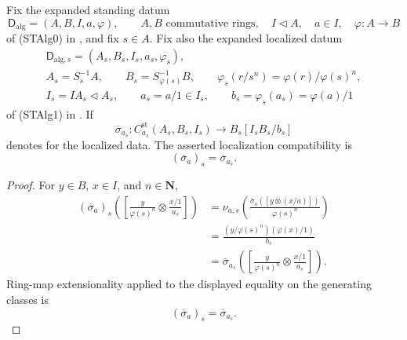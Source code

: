 \begin{lemma}
  \label{lemma:nagata-strict-transform-chart-localization}

  Fix the expanded standing datum
  \[
    \mathsf D_{\mathrm{alg}}=(A,B,I,a,\varphi),\qquad
    A,B\text{ commutative rings},\quad
    I\triangleleft A,\quad a\in I,\quad
    \varphi\colon A\to B
  \]
  of (STAlg0) in
  , and fix $s\in A$.
  Fix also the expanded localized datum
  \[
  \begin{gathered}
    \mathsf D_{\mathrm{alg},s}
      =(A_s,B_s,I_s,a_s,\varphi_s),\\
    A_s=S_s^{-1}A,\qquad
    B_s=S_{\varphi(s)}^{-1}B,\qquad
    \varphi_s(r/s^n)=\varphi(r)/\varphi(s)^n,\\
    I_s=IA_s\triangleleft A_s,\qquad
    a_s=a/1\in I_s,\qquad
    b_s=\varphi_s(a_s)=\varphi(a)/1
  \end{gathered}
  \]
  of (STAlg1) in
  .
  If
  \[
    \overline\sigma_{a_s}\colon
      C_{a_s}^{\mathrm{st}}(A_s,B_s,I_s)
      \to B_s[I_sB_s/b_s]
  \]
  denotes  for the
  localized data.  The asserted localization compatibility is
  \[
    (\overline\sigma_a)_s=\overline\sigma_{a_s}.
  \]
\end{lemma}

\begin{proof}
  For $y\in B$, $x\in I$, and $n\in\mathbf N$,
  \[
  \begin{aligned}
    (\overline\sigma_a)_s\left(
      \left[\frac y{\varphi(s)^n}\otimes\frac{x/1}{a_s}\right]\right)
      &=\nu_{a,s}\left(
        \frac{\overline\sigma_a([y\otimes(x/a)])}{\varphi(s)^n}\right)\\
      &=\frac{(y/\varphi(s)^n)(\varphi(x)/1)}{b_s}\\
      &=\overline\sigma_{a_s}\left(
        \left[\frac y{\varphi(s)^n}\otimes\frac{x/1}{a_s}\right]\right).
  \end{aligned}
  \]
  Ring-map extensionality applied to the displayed equality on the generating
  classes is
  \[
    (\overline\sigma_a)_s=\overline\sigma_{a_s}.
  \]
\end{proof}

